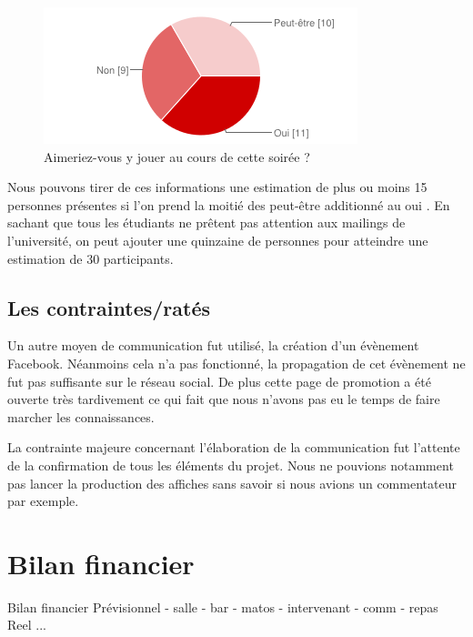 \begin{figure}
  \begin{center}
    \includegraphics[scale=1]{images/chart_3.png}
    \caption{Aimeriez-vous y jouer au cours de cette soirée ?}
    \label{char3}
  \end{center}
\end{figure}

Nous pouvons tirer de ces informations une estimation de plus ou moins 15 personnes présentes si l’on prend
la moitié des \og peut-être \fg{} additionné au \og oui \fg{}.
En sachant que tous les étudiants ne prêtent pas attention aux mailings de l’université, on peut ajouter
une quinzaine de personnes pour atteindre une estimation de 30 participants.

\newpage
\subsection{Les contraintes/ratés}%
\label{sub:les_contraintes_rates}

Un autre moyen de communication fut utilisé, la création d'un évènement
Facebook. Néanmoins cela n'a pas fonctionné, la propagation de cet
évènement ne fut pas suffisante sur le réseau social. De plus cette page
de promotion a été ouverte très tardivement ce qui fait que nous
n'avons pas eu le temps de faire marcher les connaissances.

La contrainte majeure concernant l'élaboration de la communication fut l'attente
de la confirmation de tous les éléments du projet. Nous ne pouvions
notamment pas lancer la production des affiches sans savoir si nous
avions un commentateur par exemple.


\section{Bilan financier}%
\label{sec:bilan_financier}

Bilan financier
        Prévisionnel
            - salle
            - bar
            - matos
            - intervenant
            - comm
            - repas
        Reel
           ...

